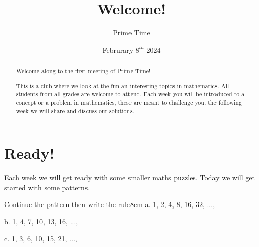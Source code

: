 \documentclass[12pt]{article}
\title{Welcome!}
\author{Prime Time}
\date{Februrary \(8^{th}\) 2024}
\begin{document}
\markboth{\theauthor}{\thetitle}

\maketitle


\begin{abstract}
    \begin{center}
        Welcome along to the first meeting of Prime Time!
    \end{center}
    This is a club where we look at the fun an interesting topics in mathematics. All students from all grades are welcome to attend. Each week you will be introduced to a concept or a problem in mathematics, these are meant to challenge you, the following week we will share and discuss our solutions. 
\end{abstract}


\section{Ready!}
    Each week we will get ready with some smaller maths puzzles.
    Today we will get started with some patterns.

    \begin{problem}{Continue the pattern then write the rule}{8cm}
        \vspace{5mm}
        a. 1, 2, 4, 8, 16, 32, ..., %
        \vspace{0.5cm}

        b. 1, 4, 7, 10, 13, 16, ..., %
        \vspace{0.5cm}

        c. 1, 3, 6, 10, 15, 21, ..., %
        \vspace{0.5cm}
    \end{problem}
\end{document}
